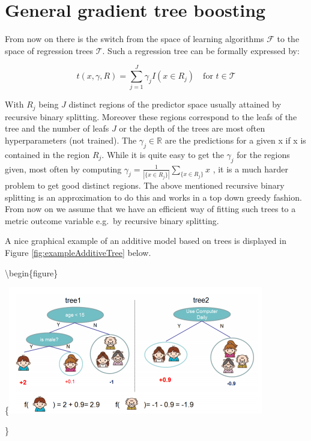 \documentclass[
]{book}
\begin{document}
\hypertarget{general-gradient-tree-boosting}{%
\section{General gradient tree boosting}\label{general-gradient-tree-boosting}}

From now on there is the switch from the space of learning algorithms \(\mathcal{F}\) to the space of regression trees \(\mathcal{T}\). Such a regression tree can be formally expressed by:

\begin{equation}
  t(x, \gamma, R) = \sum_{j=1}^J \gamma_j I(x \in R_j) \quad \text{for  } t \in \mathcal{T}
  \label{eq:treeDef}
\end{equation}

With \(R_j\) being \(J\) distinct regions of the predictor space usually attained by recursive binary splitting. Moreover these regions correspond to the leafs of the tree and the number of leafs \(J\) or the depth of the trees are most often hyperparameters (not trained). The \(\gamma_j \in \mathbb{R}\) are the predictions for a given x if x is contained in the region \(R_j\). While it is quite easy to get the \(\gamma_j\) for the regions given, most often by computing \(\gamma_j = \frac{1}{|\{x \in R_j\}|} \sum_{\{x \in R_j\}} x\) , it is a much harder problem to get good distinct regions. The above mentioned recursive binary splitting is an approximation to do this and works in a top down greedy fashion.\citep{elements} From now on we assume that we have an efficient way of fitting such trees to a metric outcome variable e.g.~by recursive binary splitting.

A nice graphical example of an additive model based on trees is displayed in Figure \ref{fig:exampleAdditiveTree} below.

\textbackslash begin\{figure\}

\{\centering \includegraphics[width=0.7\linewidth]{_pictures/boosting_easy}

\}
\end{document}
